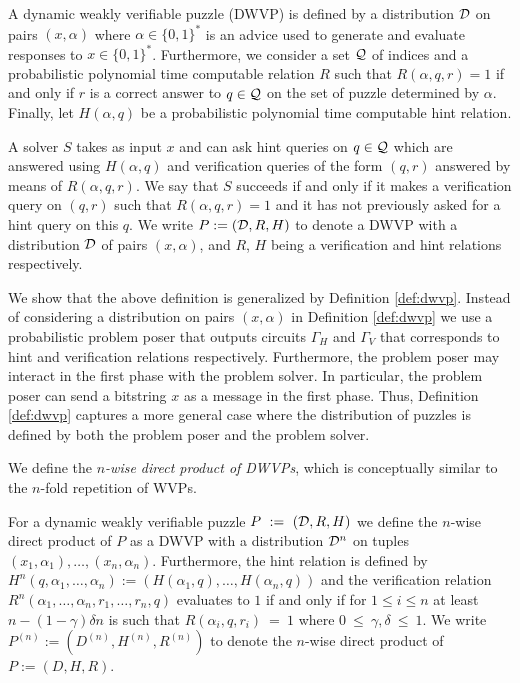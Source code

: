 \begin{definition}
  \label{def:dwvp_dodis}
  A \textnormal{dynamic weakly verifiable puzzle} (DWVP) is defined by a distribution $\mathcal{D}$ on pairs $(x, \alpha)$
  where $\alpha \in \{0,1\}^{*}$ is an advice used to generate and evaluate responses to $x \in \{0,1\}^{*}$.
  Furthermore, we consider a set $\mathcal{Q}$ of indices and a probabilistic polynomial time computable relation $R$ such that
  $R(\alpha, q, r) = 1$ if and only if $r$ is a correct answer to $q \in \mathcal{Q}$ on the set of puzzle determined by $\alpha$.
  Finally, let $H(\alpha, q)$ be a probabilistic polynomial time computable \textnormal{hint} relation.

  A solver $S$ takes as input $x$ and can ask hint queries on $q \in \mathcal{Q}$ which are answered using $H(\alpha, q)$ and verification
  queries of the form $(q,r)$ answered by means of $R(\alpha, q, r)$.
  We say that $S$ succeeds if and only if it makes a verification query on $(q,r)$ such that
  $R(\alpha,q,r) = 1$ and it
  has not previously asked for a hint query on this $q$. We write $P := (\mathcal{D}, R, H)$ to denote a DWVP with a distribution
  $\mathcal{D}$ of pairs $(x, \alpha)$, and $R$, $H$ being a verification and hint relations respectively.
\end{definition}
%
We show that the above definition is generalized by Definition \ref{def:dwvp}.
Instead of considering a distribution on pairs $(x,\alpha)$ in Definition \ref{def:dwvp}
we use a probabilistic problem poser that outputs circuits $\Gamma_H$ and $\Gamma_V$ that corresponds to hint
and verification relations respectively.
Furthermore, the problem poser may interact in the first phase with the problem solver.
In particular, the problem poser can send a bitstring $x$ as a message in the first phase.
Thus, Definition \ref{def:dwvp} captures a more general case where the distribution of
puzzles is defined by both the problem poser and the problem solver.

We define the \textit{$n$-wise direct product of DWVPs}, which is conceptually similar to the $n$-fold repetition of WVPs.
%
\begin{definition}
For a dynamic weakly verifiable puzzle $P~:=~(\mathcal{D}, R, H)$ we define the $n$-wise direct product of $P$
as a DWVP with a distribution $\mathcal{D}^n$ on tuples $(x_1, \alpha_1), \dotsc, (x_n, \alpha_n)$.
Furthermore, the hint relation is defined by $H^n(q, \alpha_1, \dotsc, \alpha_n) := (H(\alpha_1, q), \dotsc, H(\alpha_n, q))$ and
the verification relation $R^n(\alpha_1, \dotsc, \alpha_n, r_1, \dotsc, r_n, q)$ evaluates to $1$ if and only if
for $1 \leq i \leq n$ at least $n - (1 - \gamma)\delta n$ is such that $R(\alpha_i, q, r_i)~=~1$
where $0~\leq~\gamma,\delta~\leq~1$.
%
We write $P^{(n)} := (D^{(n)}, H^{(n)}, R^{(n)})$ to denote the $n$-wise direct product of $P := (D,H,R)$.
%
\end{definition}

